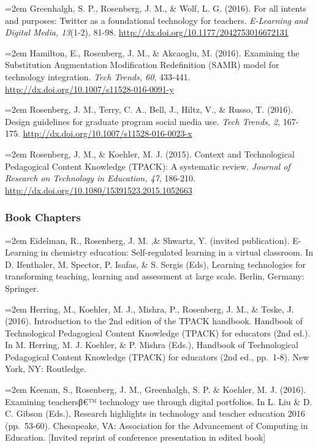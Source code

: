 \documentclass[]{article}
\newcommand{\euro}{€}
\begin{document}
\hangindent=2em Greenhalgh, S. P., Rosenberg, J. M., \& Wolf, L. G.
(2016). For all intents and purposes: Twitter as a foundational
technology for teachers. \emph{E-Learning and Digital Media, 13}(1-2),
81-98. \url{http://dx.doi.org/10.1177/2042753016672131}

\hangindent=2em Hamilton, E., Rosenberg, J. M., \& Akcaoglu, M. (2016).
Examining the Substitution Augmentation Modification Redefinition (SAMR)
model for technology integration. \emph{Tech Trends, 60}, 433-441.
\url{http://dx.doi.org/10.1007/s11528-016-0091-y}

\hangindent=2em Rosenberg, J. M., Terry, C. A., Bell, J., Hiltz, V., \&
Russo, T. (2016). Design guidelines for graduate program social media
use. \emph{Tech Trends, 2}, 167-175.
\url{http://dx.doi.org/10.1007/s11528-016-0023-x}

\hangindent=2em Rosenberg, J. M., \& Koehler, M. J. (2015). Context and
Technological Pedagogical Content Knowledge (TPACK): A systematic
review. \emph{Journal of Research on Technology in Education, 47},
186-210. \url{http://dx.doi.org/10.1080/15391523.2015.1052663}

\subsubsection{Book Chapters}\label{book-chapters}

\hangindent=2em Eidelman, R., Rosenberg, J. M. ,\& Shwartz, Y. (invited
publication). E-Learning in chemistry education: Self-regulated learning
in a virtual classroom. In D. Ifenthaler, M. Spector, P. Isafas, \& S.
Sergis (Eds), Learning technologies for transforming teaching, learning
and assessment at large scale. Berlin, Germany: Springer.

\hangindent=2em Herring, M., Koehler, M. J., Mishra, P., Rosenberg, J.
M., \& Teske, J. (2016). Introduction to the 2nd edition of the TPACK
handbook. Handbook of Technological Pedagogical Content Knowledge
(TPACK) for educators (2nd ed.). In M. Herring, M. J. Koehler, \& P.
Mishra (Eds.), Handbook of Technological Pedagogical Content Knowledge
(TPACK) for educators (2nd ed., pp.~1-8). New York, NY: Routledge.

\hangindent=2em Keenan, S., Rosenberg, J. M., Greenhalgh, S. P. \&
Koehler, M. J. (2016). Examining teachersβ\euro{}™ technology use
through digital portfolios. In L. Liu \& D. C. Gibson (Eds.), Research
highlights in technology and teacher education 2016 (pp.~53-60).
Chesapeake, VA: Association for the Advancement of Computing in
Education. {[}Invited reprint of conference presentation in edited
book{]}
\end{document}
